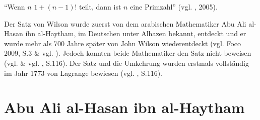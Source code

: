 \begin{theorem}
``Wenn $n$  $1+(n-1)!$ teilt, dann ist $n$ eine Primzahl''
(vgl. \cite{oconnor_wilson}, 2005).
\end{theorem}

Der Satz von Wilson wurde zuerst von dem arabischen
Mathematiker Abu Ali al-Hasan ibn al-Haytham, im
Deutschen unter Alhazen bekannt, entdeckt und er wurde
mehr als 700 Jahre später von John Wilson wiederentdeckt
(vgl. Foco 2009, S.3 \& vgl. \cite{alhazen}). Jedoch konnten
beide Mathematiker den Satz nicht beweisen
(vgl. \cite{oconnor_wilson} \& vgl. \cite{ziegenbalg},
S.116). Der Satz und die Umkehrung wurden erstmals
vollständig im Jahr 1773 von Lagrange bewiesen
(vgl. \cite{ziegenbalg}, S.116).


\section{Abu Ali al-Hasan ibn al-Haytham}

